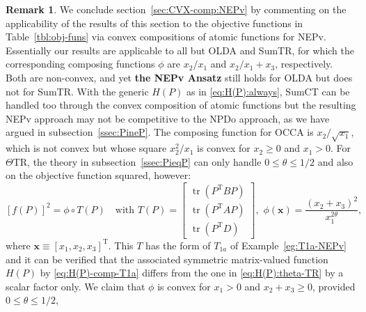 \documentclass[11pt]{article}
\def\bx{\pmb{x}}
\def\bbR{\mathbb{R}}
\DeclareMathOperator{\tr}{tr}
\DeclareMathOperator{\T}{T}
\theoremstyle{definition}
\newtheorem{remark}{Remark}[section]
\numberwithin{equation}{section}
\begin{document}
\begin{remark}\label{rk:app-NEPv-cvx}
We conclude section~\ref{sec:CVX-comp:NEPv} by commenting on the applicability of the results of this section
to the objective functions
in Table~\ref{tbl:obj-funs} via convex compositions of atomic functions for NEPv.
Essentially our results are applicable to
all but OLDA and SumTR, for which the corresponding composing functions $\phi$ are
$x_2/x_1$ and $x_2/x_1+x_3$, respectively. Both are non-convex, and yet {\bf the NEPv Ansatz} still holds for
OLDA but does not for SumTR.
With the generic $H(P)$ as in \eqref{eq:H(P):always}, SumCT
can be handled too through the convex composition of atomic functions but the resulting NEPv approach may not be competitive to the NPDo approach,
as we have argued in subsection~\ref{ssec:PineP}.
The composing function for OCCA is $x_2/\sqrt{x_1}$, which is not convex but whose square $x_2^2/x_1$ is convex for $x_2\ge 0$ and $x_1>0$.
%
%
For $\Theta$TR, the theory in subsection~\ref{ssec:PieqP} can only handle $0\le\theta\le 1/2$
and also on the objective function squared, however:
\begin{equation}\label{eq:ThetaTR:cvx2}
[f(P)]^2=\phi\circ T(P)
\quad\mbox{with}\,\, T(P)=\begin{bmatrix}
                             \tr(P^{\T}BP) \\
                             \tr(P^{\T}AP) \\
                             \tr(P^{\T}D)
                           \end{bmatrix}, \,\,
\phi(\bx)
    =\frac {(x_2+x_3)^2}{x_1^{2\theta}},
\end{equation}
where $\bx\equiv [x_1,x_2,x_3]^{\T}$.
This $T$ has the form of $T_{1a}$  of Example~\ref{eg:T1a-NEPv} and it can be verified that the associated symmetric matrix-valued
function $H(P)$ by \eqref{eq:H(P)-comp-T1a} differs from the one in \eqref{eq:H(P):theta-TR} \cite{wazl:2023} by a scalar factor only.
We claim that $\phi$ is convex for $x_1>0$ and $x_2+x_3\ge 0$, provided $0\le\theta\le 1/2$,

\end{remark}
\end{document}
